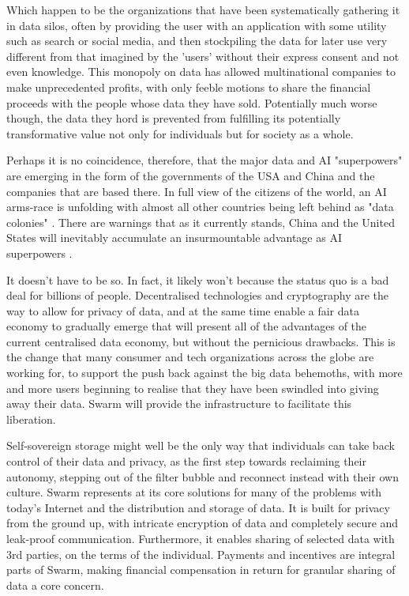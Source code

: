Which happen to be the organizations that have been systematically gathering it in data silos, often by providing the user with an application with some utility such as search or social media, and then stockpiling the data for later use very different from that imagined by the 'users' without their express consent and not even knowledge. This monopoly on data has allowed multinational companies to make unprecedented profits, with only feeble motions to share the financial proceeds with the people whose data they have sold. Potentially much worse though, the data they hord is prevented from fulfilling its potentially transformative value not only for individuals but for society as a whole.

Perhaps it is no coincidence, therefore, that the major data and AI "superpowers" are emerging in the form of the governments of the USA and China and the companies that are based there. In full view of the citizens of the world, an AI arms-race is unfolding with almost all other countries being left behind as "data colonies" \cite{HarariDavos2020Mar}. There are warnings that as it currently stands, China and the United States will inevitably accumulate an insurmountable advantage as AI superpowers \cite{Lee2018Sep}.

It doesn't have to be so. In fact, it likely won't because the status quo is a bad deal for billions of people. Decentralised technologies and cryptography are the way to allow for privacy of data, and at the same time enable a fair data economy to gradually emerge that will present all of the advantages of the current centralised data economy, but without the pernicious drawbacks. This is the change that many consumer and tech organizations across the globe are working for, to support the push back against the big data behemoths, with more and more users beginning to realise that they have been swindled into giving away their data. Swarm will provide the infrastructure to facilitate this liberation.

Self-sovereign storage might well be the only way that individuals can take back control of their data and privacy, as the first step towards reclaiming their autonomy, stepping out of the filter bubble and reconnect instead with their own culture. Swarm represents at its core solutions for many of the problems with today's Internet and the distribution and storage of data. It is built for privacy from the ground up, with intricate encryption of data and completely secure and leak-proof communication. Furthermore, it enables sharing of selected data with 3rd parties, on the terms of the individual. Payments and incentives are integral parts of Swarm, making financial compensation in return for granular sharing of data a core concern.

